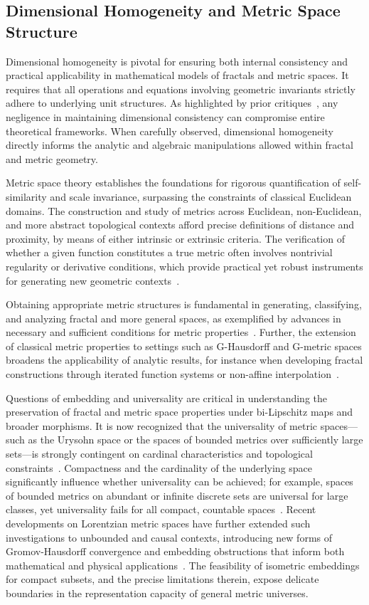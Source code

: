 \documentclass[sigconf]{acmart}
\begin{document}
\subsection{Dimensional Homogeneity and Metric Space Structure}

Dimensional homogeneity is pivotal for ensuring both internal consistency and practical applicability in mathematical models of fractals and metric spaces. It requires that all operations and equations involving geometric invariants strictly adhere to underlying unit structures. As highlighted by prior critiques~\cite{ref61}, any negligence in maintaining dimensional consistency can compromise entire theoretical frameworks. When carefully observed, dimensional homogeneity directly informs the analytic and algebraic manipulations allowed within fractal and metric geometry.

Metric space theory establishes the foundations for rigorous quantification of self-similarity and scale invariance, surpassing the constraints of classical Euclidean domains. The construction and study of metrics across Euclidean, non-Euclidean, and more abstract topological contexts afford precise definitions of distance and proximity, by means of either intrinsic or extrinsic criteria. The verification of whether a given function constitutes a true metric often involves nontrivial regularity or derivative conditions, which provide practical yet robust instruments for generating new geometric contexts~\cite{ref48}. 

Obtaining appropriate metric structures is fundamental in generating, classifying, and analyzing fractal and more general spaces, as exemplified by advances in necessary and sufficient conditions for metric properties~\cite{ref48}. Further, the extension of classical metric properties to settings such as G-Hausdorff and G-metric spaces broadens the applicability of analytic results, for instance when developing fractal constructions through iterated function systems or non-affine interpolation~\cite{ref6}. 

Questions of embedding and universality are critical in understanding the preservation of fractal and metric space properties under bi-Lipschitz maps and broader morphisms. It is now recognized that the universality of metric spaces—such as the Urysohn space or the spaces of bounded metrics over sufficiently large sets—is strongly contingent on cardinal characteristics and topological constraints~\cite{ref50,ref51}. Compactness and the cardinality of the underlying space significantly influence whether universality can be achieved; for example, spaces of bounded metrics on abundant or infinite discrete sets are universal for large classes, yet universality fails for all compact, countable spaces~\cite{ref50}. Recent developments on Lorentzian metric spaces have further extended such investigations to unbounded and causal contexts, introducing new forms of Gromov-Hausdorff convergence and embedding obstructions that inform both mathematical and physical applications~\cite{ref51}. The feasibility of isometric embeddings for compact subsets, and the precise limitations therein, expose delicate boundaries in the representation capacity of general metric universes.
\end{document}
